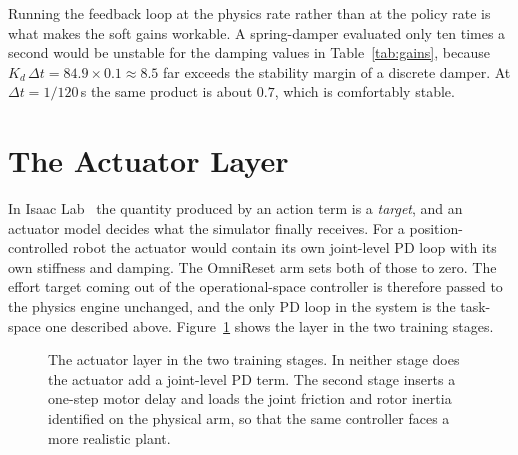 \documentclass{article}
\newcommand{\Kd}{K_d}
\newcommand{\subl}[1]{{\scriptsize\color{black!60}#1}}
\begin{document}
Running the feedback loop at the physics rate rather than at the policy rate is what makes the soft gains workable. A spring-damper evaluated only ten times a second would be unstable for the damping values in Table~\ref{tab:gains}, because $\Kd\,\Delta t=84.9\times0.1\approx8.5$ far exceeds the stability margin of a discrete damper. At $\Delta t=1/120$\,s the same product is about $0.7$, which is comfortably stable.

\section{The Actuator Layer}
\label{sec:actuator}

In Isaac Lab~\cite{mittal2023orbit} the quantity produced by an action term is a \emph{target}, and an actuator model decides what the simulator finally receives. For a position-controlled robot the actuator would contain its own joint-level PD loop with its own stiffness and damping. The OmniReset arm sets both of those to zero. The effort target coming out of the operational-space controller is therefore passed to the physics engine unchanged, and the only PD loop in the system is the task-space one described above. Figure~\ref{fig:actuator} shows the layer in the two training stages.

\begin{figure}[t]
\centering
{}
\caption{The actuator layer in the two training stages. In neither stage does the actuator add a joint-level PD term. The second stage inserts a one-step motor delay and loads the joint friction and rotor inertia identified on the physical arm, so that the same controller faces a more realistic plant.}
\label{fig:actuator}
\end{figure}
\end{document}
